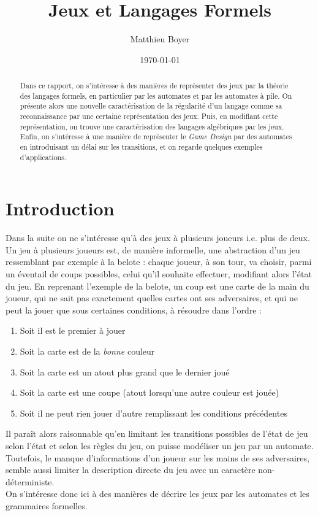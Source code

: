 \documentclass{cours}
\title{Jeux et Langages Formels}
\author{Matthieu Boyer}
\date{\today}
\begin{document}
\begin{abstract}
    Dans ce rapport, on s'intéresse à des manières de représenter des jeux par la théorie des langages formels, en particulier par les automates et par les automates à pile. On présente alors une nouvelle caractérisation de la régularité d'un langage comme sa reconnaissance par une certaine représentation des jeux. Puis, en modifiant cette représentation, on trouve une caractérisation des langages algébriques par les jeux. Enfin, on s'intéresse à une manière de représenter le \textit{Game Design} par des automates en introduisant un délai sur les transitions, et on regarde quelques exemples d'applications.
\end{abstract}

\section*{Introduction}
Dans la suite on ne s'intéresse qu'à des jeux à plusieurs joueurs i.e. plus de deux.\\
Un jeu à plusieurs joueurs est, de manière informelle, une abstraction d'un jeu ressemblant par exemple à la belote : chaque joueur, à son tour, va choisir, parmi un éventail de coups possibles, celui qu'il souhaite effectuer, modifiant alors l'état du jeu. En reprenant l'exemple de la belote, un coup est une carte de la main du joueur, qui ne sait pas exactement quelles cartes ont ses adversaires, et qui ne peut la jouer que sous certaines conditions, à résoudre dans l'ordre :
\begin{enumerate}
    \item Soit il est le premier à jouer
    \item Soit la carte est de la \textit{bonne} couleur
    \item Soit la carte est un atout plus grand que le dernier joué
    \item Soit la carte est une coupe (atout lorsqu'une autre couleur est jouée)
    \item Soit il ne peut rien jouer d'autre remplissant les conditions précédentes
\end{enumerate}
Il paraît alors raisonnable qu'en limitant les transitions possibles de l'état de jeu selon l'état et selon les règles du jeu, on puisse modéliser un jeu par un automate. Toutefois, le manque d'informations d'un joueur sur les mains de ses adversaires, semble aussi limiter la description directe du jeu avec un caractère non-déterministe. \\
On s'intéresse donc ici à des manières de décrire les jeux par les automates et les grammaires formelles.
\end{document}
